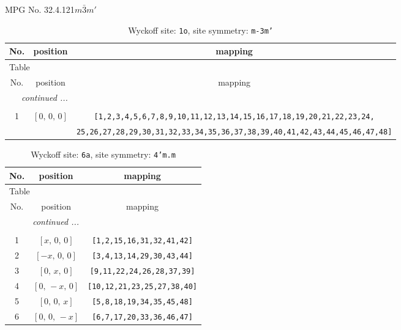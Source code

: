 \documentclass[fleqn,8pt]{jsarticle}
\begin{document}
\setcounter{MaxMatrixCols}{32}

\renewcommand{\tablename}{Table~}
\renewcommand{\figurename}{Figure~}
\begin{center}
\LARGE
MPG No. 32.4.121\quad$m\bar{3}m'$
\end{center}
\renewcommand{\arraystretch}{1.2}
\begin{longtable}{ccc}
\caption{Wyckoff site: {\tt 1o}, site symmetry: {\tt m-3m'}}
 \\
 \hline \hline
No. & position & mapping \\ \hline \endfirsthead

\multicolumn{2}{l}{\tablename\ \thetable{}} \\
 \hline \hline
No. & position & mapping \\ \hline \endhead

 \hline \hline
\multicolumn{2}{r}{\footnotesize\it continued ...} \\ \endfoot

 \hline \hline
\multicolumn{2}{r}{} \\ \endlastfoot

1 & $\left[ 0,\, 0,\, 0 \right]$ & {\tt [1,2,3,4,5,6,7,8,9,10,11,12,13,14,15,16,17,18,19,20,21,22,23,24,} \\ \hline
 &  & {\tt 25,26,27,28,29,30,31,32,33,34,35,36,37,38,39,40,41,42,43,44,45,46,47,48]} \\
\end{longtable}
\renewcommand{\arraystretch}{1.2}
\begin{longtable}{ccc}
\caption{Wyckoff site: {\tt 6a}, site symmetry: {\tt 4'm.m}}
 \\
 \hline \hline
No. & position & mapping \\ \hline \endfirsthead

\multicolumn{2}{l}{\tablename\ \thetable{}} \\
 \hline \hline
No. & position & mapping \\ \hline \endhead

 \hline \hline
\multicolumn{2}{r}{\footnotesize\it continued ...} \\ \endfoot

 \hline \hline
\multicolumn{2}{r}{} \\ \endlastfoot

1 & $\left[ x,\, 0,\, 0 \right]$ & {\tt [1,2,15,16,31,32,41,42]} \\ \hline
2 & $\left[ - x,\, 0,\, 0 \right]$ & {\tt [3,4,13,14,29,30,43,44]} \\ \hline
3 & $\left[ 0,\, x,\, 0 \right]$ & {\tt [9,11,22,24,26,28,37,39]} \\ \hline
4 & $\left[ 0,\, - x,\, 0 \right]$ & {\tt [10,12,21,23,25,27,38,40]} \\ \hline
5 & $\left[ 0,\, 0,\, x \right]$ & {\tt [5,8,18,19,34,35,45,48]} \\ \hline
6 & $\left[ 0,\, 0,\, - x \right]$ & {\tt [6,7,17,20,33,36,46,47]} \\
\end{longtable}
\end{document}
